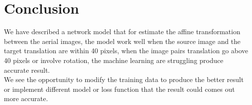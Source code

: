 \section{Conclusion}
 We have described a network model that for estimate the affine transformation between the aerial images, the model work well when the source image and the target translation are within 40 pixels, when the image pairs translation go above 40 pixels or involve rotation, the machine learning are struggling produce accurate result.\\ 
   We see the opportunity to modify the training data to produce the better result or implement different model or loss function that the result could comes out more accurate. 